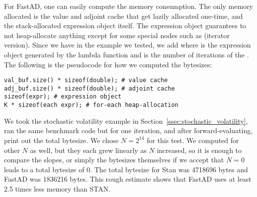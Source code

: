 For FastAD, one can easily compute the memory consumption.
The only memory allocated is the value and adjoint cache that get lazily allocated one-time,
and the stack-allocated expression object itself.
The expression object guarantees to not heap-allocate anything 
except for some special nodes such as  (iterator version).
Since we have  in the example we tested, 
we add  where 
is the expression object generated by the lambda function
and  is the number of iterations of the .
The following is the pseudocode for how we computed the bytesizes:
\begin{lstlisting}[style=customcpp]
val_buf.size() * sizeof(double); # value cache
adj_buf.size() * sizeof(double); # adjoint cache
sizeof(expr); # expression object
K * sizeof(each expr); # for-each heap-allocation
\end{lstlisting} 

We took the stochastic volatility example in Section~\ref{ssec:stochastic_volatility},
ran the same benchmark code but for one iteration,
and after forward-evaluating, print out the total bytesize.
We chose $N = 2^{14}$ for this test.
We computed for other $N$ as well, but they each grew linearly as $N$ increased,
so it is enough to compare the slopes, 
or simply the bytesizes themselves 
if we accept that $N=0$ leads to a total bytesize of $0$.
The total bytesize for Stan was 4718696 bytes and FastAD was 1836216 bytes.
This rough estimate shows that FastAD uses at least 2.5 times less memory than STAN.
